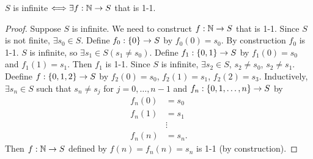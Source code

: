 \documentclass[]{article}
\begin{document}
\begin{proposition}
	$S$ is infinite $\Longleftrightarrow \exists f:\mathbb{N} \rightarrow S$ that is 1-1.
\end{proposition}
\begin{proof}
	\say{$\implies$} Suppose $S$ is infinite. We need to construct $f:\mathbb{N}\rightarrow S$ that is 1-1. Since $S$ is not finite, $\exists s_0\in S$.
	Define $f_0:\{0\}\rightarrow S$ by $f_0(0) = s_0$. By construction $f_0$ is 1-1.
	$S$ is infinite, so $\exists s_1\in S (s_1\neq s_0)$.
	Define $f_1:\{0,1\} \rightarrow S$ by $f_1(0) = s_0$ and $f_1(1) = s_1$.
	Then $f_1$ is 1-1. Since $S$ is infinite, $\exists s_2\in S$, $s_2\neq s_0$, $s_2\neq s_1$. Deefine $f:\{0,1,2\} \rightarrow S$ by $f_2(0) = s_0$, $f_2(1) = s_1$, $f_2(2) = s_3$.
	Inductively, $\exists s_n\in S$ such that $s_n\neq s_j$ for $j=0,\dots,n-1$ and $f_n : \{0,1,\dots,n\}\rightarrow S$ by
	\begin{align*}
		f_n(0) &= s_0 \\
		f_n(1) &= s_1 \\
		       &\vdots \\
		f_n(n) &= s_n.
	\end{align*}
	Then $f:\mathbb{N}\rightarrow S$ defined by $f(n) = f_n(n) = s_n$ is 1-1 (by construction).
\end{proof}
\end{document}
